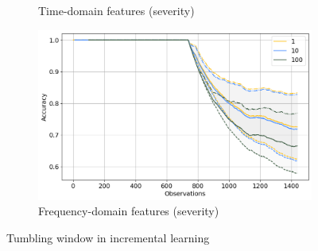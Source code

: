 \begin{figure}[h]
\begin{subfigure}[b]{0.48\textwidth}
        \caption{Time-domain features (severity)}
    \end{subfigure}
    \hfill
    \begin{subfigure}[b]{0.48\textwidth}
        \includegraphics[width=\textwidth]{assets/results/incremental-learning/tumbling-FD-severity.png}
        \caption{Frequency-domain features (severity)}
    \end{subfigure} 
    \caption{Tumbling window in incremental learning}
\end{figure}



